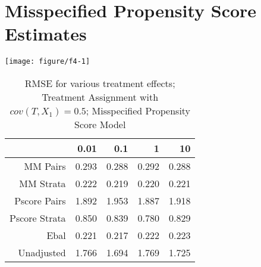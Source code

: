 \documentclass[11pt]{article}\usepackage[]{graphicx}\usepackage[]{color}
\makeatletter
\def\maxwidth{ %
  \ifdim\Gin@nat@width>\linewidth
    \linewidth
  \else
    \Gin@nat@width
  \fi
}
\newenvironment{knitrout}{}{} %
\makeatother
\begin{document}
\section{Misspecified Propensity Score Estimates}
\begin{knitrout}
\color{fgcolor}

{\centering \texttt{[image: figure/f4-1]} 

}



\end{knitrout}
\begin{table}[ht]
\centering
\begin{tabular}{rrrrr}
  \hline
 & 0.01 & 0.1 & 1 & 10 \\ 
  \hline
MM Pairs & 0.293 & 0.288 & 0.292 & 0.288 \\ 
  MM Strata & 0.222 & 0.219 & 0.220 & 0.221 \\ 
  Pscore Pairs & 1.892 & 1.953 & 1.887 & 1.918 \\ 
  Pscore Strata & 0.850 & 0.839 & 0.780 & 0.829 \\ 
  Ebal & 0.221 & 0.217 & 0.222 & 0.223 \\ 
  Unadjusted & 1.766 & 1.694 & 1.769 & 1.725 \\ 
   \hline
\end{tabular}
\caption{RMSE for various treatment effects; Treatment Assignment with $cov(T, X_1) = 0.5$; Misspecified Propensity Score Model} 
\label{tab:f4}
\end{table}
\end{document}
